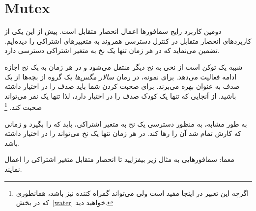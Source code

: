 \documentclass{book}
\begin{document}
\section{Mutex}

    دومین کاربرد رایج سمافورها اعمال انحصار متقابل است. 
    پیش از این یکی از کاربردهای انحصار متقابل در کنترل دسترسی همروند به متغییرهای اشتراکی را دیده‌ایم.
    تضمین می‌نماید که در هر زمان تنها یک نخ به متغیر اشتراکی دسترسی دارد. 

    شبیه یک توکن است از نخی به نخ دیگر منتقل می‌شود و در هر زمان به یک نخ اجازه ادامه فعالیت می‌دهد. 
    برای نمونه، در رمان \emph{سالار مگس‌ها} یک گروه از بچه‌ها از یک صدف به عنوان  
    بهره می‌برند. برای صحبت کردن شما باید صدف را در اختیار داشته باشید. از آنجایی که تنها یک کودک صدف را در اختیار دارد، لذا تنها یک نفر می‌تواند 
    صحبت کند. \footnote{اگرچه  این تعبیر در اینجا مفید است ولی می‌تواند گمراه کننده نیز  باشد، همانطوری که در بخش~\ref{water} خواهید دید. }

    به طور مشابه، به منظور دسترسی یک نخ به متغیر اشتراکی، باید که   را بگیرد و زمانی که کارش تمام شد آن را رها کند. 
    در هر زمان تنها یک نخ می‌تواند   را در اختیار داشته باشد. 
    
    معما: سمافورهایی به مثال زیر بیفزایید تا انحصار متقابل متغیر اشتراکی  را اعمال نمایند. 
    
\end{document}
